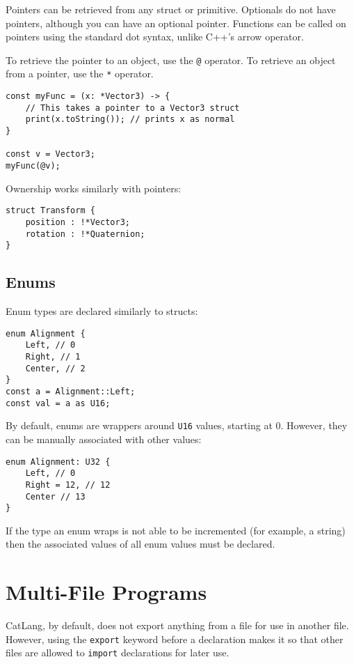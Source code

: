 \documentclass[12pt]{article}
\begin{document}
Pointers can be retrieved from any struct or primitive. Optionals do not have pointers, although you can have an optional pointer. Functions can be called on pointers using the standard dot syntax, unlike C++'s arrow operator.

To retrieve the pointer to an object, use the \lstinline!@! operator. To retrieve an object from a pointer, use the \lstinline!*! operator.

\begin{lstlisting}
const myFunc = (x: *Vector3) -> {
	// This takes a pointer to a Vector3 struct
	print(x.toString()); // prints x as normal
}

const v = Vector3;
myFunc(@v);
\end{lstlisting}

Ownership works similarly with pointers:

\begin{lstlisting}
struct Transform {
	position : !*Vector3;
	rotation : !*Quaternion;
}
\end{lstlisting}

\subsection{Enums}

Enum types are declared similarly to structs:

\begin{lstlisting}
enum Alignment {
	Left, // 0
	Right, // 1
	Center, // 2
}
const a = Alignment::Left;
const val = a as U16;
\end{lstlisting}

By default, enums are wrappers around \lstinline!U16! values, starting at 0. However, they can be manually associated with other values:

\begin{lstlisting}
enum Alignment: U32 {
	Left, // 0
	Right = 12, // 12
	Center // 13
}
\end{lstlisting}

If the type an enum wraps is not able to be incremented (for example, a string) then the associated values of all enum values must be declared.

\section{Multi-File Programs}
CatLang, by default, does not export anything from a file for use in another file. However, using the \lstinline!export! keyword before a declaration makes it so that other files are allowed to \lstinline!import! declarations for later use.
\end{document}
